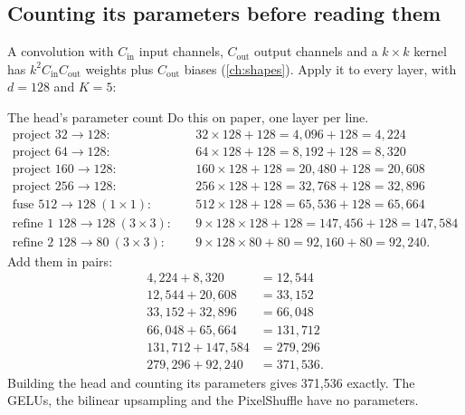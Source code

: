 \subsection{Counting its parameters before reading them}

A convolution with $C_{\text{in}}$ input channels, $C_{\text{out}}$ output channels and a $k \times k$ kernel has
$k^2 C_{\text{in}} C_{\text{out}}$ weights plus $C_{\text{out}}$ biases (\cref{ch:shapes}). Apply it to every layer, with $d = 128$
and $K = 5$:

\begin{worked}[label={we:seghead:params}]{The head's parameter count}
Do this on paper, one layer per line.
\begin{align*}
  \text{project } 32 \to 128:&\quad 32 \times 128 + 128 = 4{,}096 + 128 = 4{,}224\\
  \text{project } 64 \to 128:&\quad 64 \times 128 + 128 = 8{,}192 + 128 = 8{,}320\\
  \text{project } 160 \to 128:&\quad 160 \times 128 + 128 = 20{,}480 + 128 = 20{,}608\\
  \text{project } 256 \to 128:&\quad 256 \times 128 + 128 = 32{,}768 + 128 = 32{,}896\\
  \text{fuse } 512 \to 128 \ (1\times1):&\quad 512 \times 128 + 128 = 65{,}536 + 128 = 65{,}664\\
  \text{refine 1 } 128 \to 128 \ (3\times3):&\quad 9 \times 128 \times 128 + 128 = 147{,}456 + 128 = 147{,}584\\
  \text{refine 2 } 128 \to 80 \ (3\times3):&\quad 9 \times 128 \times 80 + 80 = 92{,}160 + 80 = 92{,}240.
\end{align*}
Add them in pairs:
\begin{align*}
  4{,}224 + 8{,}320 &= 12{,}544\\
  12{,}544 + 20{,}608 &= 33{,}152\\
  33{,}152 + 32{,}896 &= 66{,}048\\
  66{,}048 + 65{,}664 &= 131{,}712\\
  131{,}712 + 147{,}584 &= 279{,}296\\
  279{,}296 + 92{,}240 &= 371{,}536.
\end{align*}
Building the head and counting its parameters gives 371,536 \tbrk{} exactly. The
GELUs, the bilinear upsampling and the PixelShuffle have no parameters.
\end{worked}


